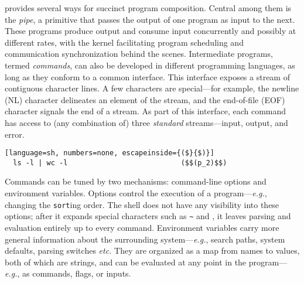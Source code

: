 \documentclass[sigplan,10pt,review,anonymous]{acmart}
\newcommand{\eg}{{\em e.g.}, }
\newcommand{\etc}{{\em etc.}\xspace}
\newcommand{\ttt}[1]{\texttt{\small #1}}
\begin{document}
\unix provides several ways for succinct program composition.
Central among them is the \emph{pipe}, a primitive that passes the output of one program as input to the next.
These programs produce output and consume input concurrently and possibly at different rates, with the \unix kernel facilitating program scheduling and communication synchronization behind the scenes.
Intermediate programs, termed \emph{commands}, can also be developed in different programming languages, as long as they conform to a common interface.
This interface exposes a stream of contiguous character lines.
A few characters are special---for example, the newline (\textsc{NL}) character delineates an element of the stream, and the end-of-file (\textsc{EOF}) character signals the end of a stream.
As part of this interface, each command has access to (any combination of) three \emph{standard} streams---input, output, and error.
\smallskip
\begin{lstlisting}[language=sh, numbers=none, escapeinside={($}{$)}]
  ls -l | wc -l                           ($$(p_2)$$)
\end{lstlisting}
\smallskip
Commands can be tuned by two mechanisms: com\-mand-line options and environment variables.
Options control the execution of a program---\eg changing the \ttt{sort}ing order.
The shell does not have any visibility into these options; 
  after it expands special characters such as \ttt{\textasciitilde{}} and \ttt{*}, it leaves parsing and evaluation entirely up to every command.
Environment variables carry more general information about the surrounding system---\eg search paths, system defaults, parsing switches \etc 
They are organized as a map from names to values, both of which are strings, and can be evaluated at any point in the program---\eg as commands, flags, or inputs. %
\end{document}
